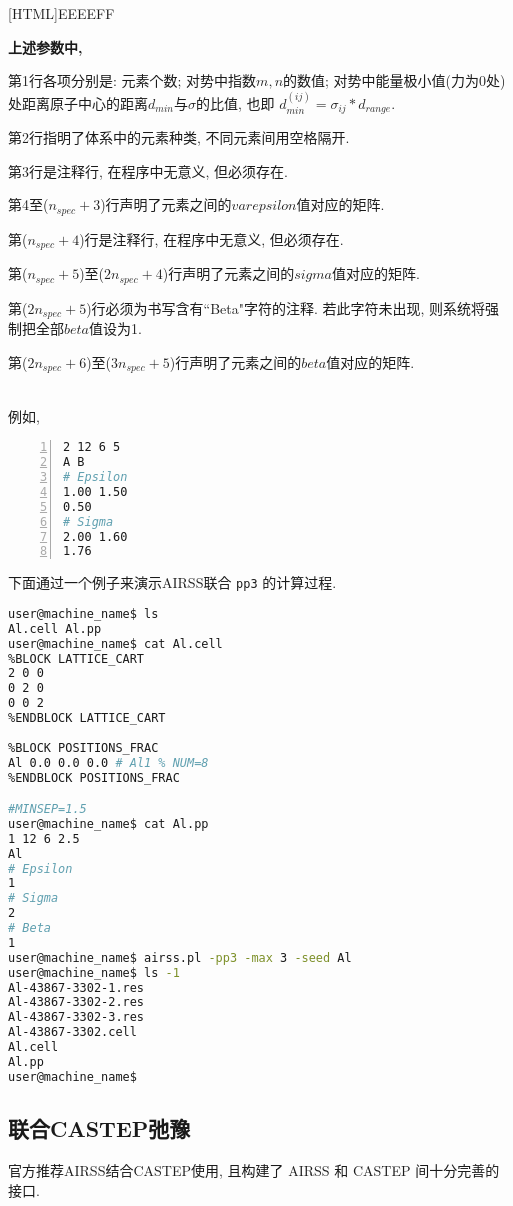\documentclass[a4paper, 10pt]{article}
\begin{document}
\noindent{}[HTML]{EEEEFF}{\parbox{\textwidth}{%
\noindent \textbf{上述参数中, }
\begin{maineu}
  \item 第1行各项分别是: 元素个数; 对势中指数\(m,n\)的数值; 对势中能量极小值(力为0处)处距离原子中心的距离\(d_{min}\)与\(\sigma\)的比值, 也即 \(d_{min}^{(ij)} = \sigma_{ij}*d_{range}\). 
  \item 第2行指明了体系中的元素种类, 不同元素间用空格隔开. 
  \item 第3行是注释行, 在程序中无意义, 但必须存在. 
  \item 第4至(\(n_{spec}+3\))行声明了元素之间的\(varepsilon\)值对应的矩阵.
  \item 第(\(n_{spec}+4\))行是注释行, 在程序中无意义, 但必须存在. 
  \item 第(\(n_{spec}+5\))至(\(2n_{spec}+4\))行声明了元素之间的\(sigma\)值对应的矩阵.
  \item 第(\(2n_{spec}+5\))行必须为书写含有``Beta"字符的注释. 若此字符未出现, 则系统将强制把全部\(beta\)值设为1.
  \item 第(\(2n_{spec}+6\))至(\(3n_{spec}+5\))行声明了元素之间的\(beta\)值对应的矩阵.
\end{maineu}}}\\

例如,
\begin{lstlisting}[language={bash},numbers=left]
2 12 6 5
A B
# Epsilon
1.00 1.50
0.50
# Sigma
2.00 1.60
1.76
\end{lstlisting}

下面通过一个例子来演示AIRSS联合 \verb|pp3| 的计算过程.
\begin{lstlisting}[language={bash}]
user@machine_name$ ls 
Al.cell Al.pp
user@machine_name$ cat Al.cell
%BLOCK LATTICE_CART
2 0 0
0 2 0
0 0 2 
%ENDBLOCK LATTICE_CART
 
%BLOCK POSITIONS_FRAC
Al 0.0 0.0 0.0 # Al1 % NUM=8
%ENDBLOCK POSITIONS_FRAC

#MINSEP=1.5
user@machine_name$ cat Al.pp
1 12 6 2.5
Al
# Epsilon
1
# Sigma
2
# Beta
1
user@machine_name$ airss.pl -pp3 -max 3 -seed Al
user@machine_name$ ls -1
Al-43867-3302-1.res
Al-43867-3302-2.res
Al-43867-3302-3.res
Al-43867-3302.cell
Al.cell
Al.pp
user@machine_name$
\end{lstlisting}

\subsection{联合CASTEP弛豫}
官方推荐AIRSS结合CASTEP使用, 且构建了 AIRSS 和 CASTEP 间十分完善的接口. 
\end{document}
